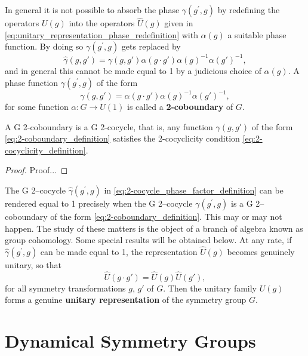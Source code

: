 In general it is not possible to absorb the phase \(\gamma(g^{\prime},g)\) by redefining the operators \(U(g)\) into the operators \(\hat{U}(g)\) given in \eqref{eq:unitary_representation_phase_redefinition} with \(\alpha(g)\) a suitable phase function. By doing so \(\gamma(g^{\prime},g)\) gets replaced by
\begin{equation}
    \hat{\gamma}(g, g') = \gamma(g, g') \alpha(g \cdot g') \alpha(g)^{-1} \alpha(g')^{-1},
    \label{eq:2-cocycle_phase_factor_definition}
\end{equation}
and in general this cannot be made equal to 1 by a judicious choice of \(\alpha(g)\). A phase function \(\gamma(g^{\prime},g)\) of the form
\begin{equation}
    \gamma(g, g') = \alpha(g \cdot g') \alpha(g)^{-1} \alpha(g')^{-1},
    \label{eq:2-coboundary_definition}
\end{equation}
for some function \(\alpha : G \to U(1)\) is called a \textbf{2-coboundary} of \(G\).

\begin{proposition}
    A G 2-coboundary is a G 2-cocycle, that is, any function \(\gamma(g, g')\) of the form \eqref{eq:2-coboundary_definition} satisfies the 2-cocyclicity condition \eqref{eq:2-cocyclicity_definition}.
\end{proposition}
\begin{proof}
    Proof...
\end{proof}

The G 2–cocycle \(\hat{\gamma}(g^{\prime},g)\) in \eqref{eq:2-cocycle_phase_factor_definition} can be rendered equal to 1 precisely when the G 2–cocycle \(\gamma(g^{\prime},g)\) is a G 2–coboundary of the form \eqref{eq:2-coboundary_definition}. This may or may not happen. The study of these matters is the object of a branch of algebra known as group cohomology. Some special results will be obtained below. At any rate, if \(\hat{\gamma}(g^{\prime},g)\) can be made equal to 1, the representation \(\hat{U}(g)\) becomes
genuinely unitary, so that
\[
    \hat{U} (g \cdot g') = \hat{U}(g) \hat{U}(g'),
\]
for all symmetry transformations \(g\), \(g'\) of \(G\). Then the unitary family \(U(g)\) forms a genuine \textbf{unitary representation} of the symmetry group \(G\).

\section{Dynamical Symmetry Groups}

